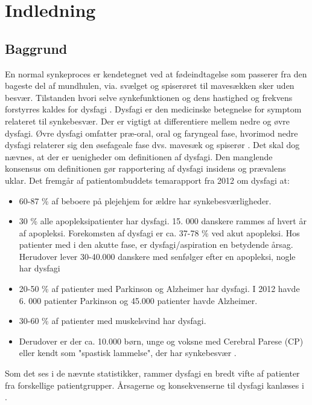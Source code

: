 \chapter{Indledning}

\section{Baggrund}
En normal synkeproces er kendetegnet ved at fødeindtagelse som passerer fra den bageste del af mundhulen, via. svælget og spiserøret til mavesækken sker uden besvær. Tilstanden hvori selve synkefunktionen og dens hastighed og frekvens forstyrres kaldes for dysfagi \cite{Sundhedsstyrelsen2015NationalDysfagi}. Dysfagi er den medicinske betegnelse for symptom relateret til synkebesvær. Der er vigtigt at differentiere mellem nedre og øvre dysfagi. Øvre dysfagi omfatter præ-oral, oral og faryngeal fase, hvorimod nedre dysfagi relaterer sig den øsefageale fase dvs. mavesæk og spiserør \cite{KjaersgaardPh.d.studerendeDYSFAGIKonsekvenser}. Det skal dog nævnes, at der er uenigheder om definitionen af dysfagi. Den manglende konsensus om definitionen gør rapportering af dysfagi insidens og prævalens uklar. Det fremgår af patientombuddets temarapport fra 2012 om dysfagi at:

\begin{itemize}
\item 60-87 \% af beboere på plejehjem for ældre har synkebesværligheder.
\item 30 \% alle apopleksipatienter har dysfagi. 15. 000 danskere rammes af hvert år af apopleksi. Forekomsten af dysfagi er ca. 37-78 \% ved akut apopleksi. Hos patienter med i den akutte fase, er dysfagi/aspiration en betydende årsag. Herudover lever 30-40.000 danskere med senfølger efter en apopleksi, nogle har dysfagi
\item 20-50 \% af patienter med Parkinson og Alzheimer har dysfagi. I 2012 havde 6. 000 patienter Parkinson og 45.000 patienter havde Alzheimer.  
\item 30-60 \% af patienter med muskelsvind har dysfagi.
\item Derudover er der ca. 10.000 børn, unge og voksne med Cerebral Parese (CP) eller kendt som "spastisk lammelse", der har synkebesvær \cite{Bommersholdt2012TemarapportDysfagi}. 
\end{itemize}

Som det ses i de nævnte statistikker, rammer dysfagi en bredt vifte af patienter fra forskellige patientgrupper. Årsagerne og konsekvenserne til dysfagi kanlæses i . 

